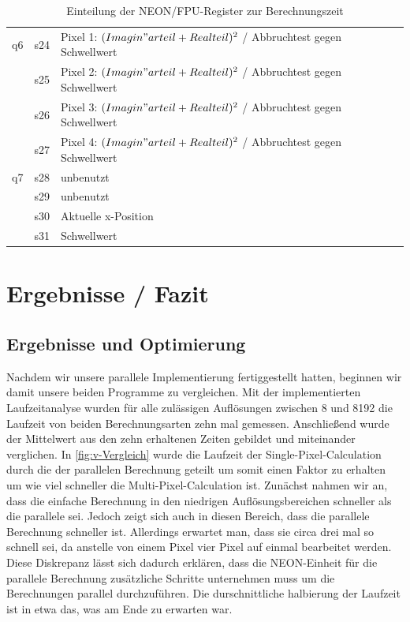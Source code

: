 \documentclass[11pt]{scrartcl}
\begin{document}
\begin{table}[!ht]
\begin{center}
\begin{tabular}{| l | l | l |}
      q6& s24& Pixel 1: $(Imagin"arteil + Realteil)^2$ / Abbruchtest gegen Schwellwert\\ \cline{2-3}
      & s25& Pixel 2: $(Imagin"arteil + Realteil)^2$ / Abbruchtest gegen Schwellwert\\ \cline{2-3}
      & s26& Pixel 3: $(Imagin"arteil + Realteil)^2$ / Abbruchtest gegen Schwellwert\\ \cline{2-3}
      & s27& Pixel 4: $(Imagin"arteil + Realteil)^2$ / Abbruchtest gegen Schwellwert\\ \hline

      q7& s28& unbenutzt\\ \cline{2-3}
      & s29& unbenutzt\\ \cline{2-3}
      & s30& Aktuelle x-Position\\ \cline{2-3}
      & s31& Schwellwert\\ \hline

    \end{tabular}
  \end{center}
  \caption{Einteilung der NEON/FPU-Register zur Berechnungszeit}
  \label{tbl: FPU}
\end{table}


\clearpage
\section{Ergebnisse / Fazit}
\subsection{Ergebnisse und Optimierung}

Nachdem wir unsere parallele Implementierung fertiggestellt hatten, beginnen wir damit unsere beiden Programme zu vergleichen.
Mit der implementierten Laufzeitanalyse wurden für alle zulässigen Auflösungen zwischen 8 und 8192 die Laufzeit von beiden Berechnungsarten zehn mal gemessen.
Anschließend wurde der Mittelwert aus den zehn erhaltenen Zeiten gebildet und miteinander verglichen.
In \autoref{fig:v-Vergleich} wurde die Laufzeit der Single-Pixel-Calculation durch die der parallelen Berechnung geteilt um somit einen Faktor zu erhalten um wie viel schneller die Multi-Pixel-Calculation ist.
Zunächst nahmen wir an, dass die einfache Berechnung in den niedrigen Auflösungsbereichen schneller als die parallele sei. Jedoch zeigt sich auch in diesen Bereich, dass die parallele Berechnung schneller ist.
Allerdings erwartet man, dass sie circa drei mal so schnell sei, da anstelle von einem Pixel vier Pixel auf einmal bearbeitet werden.
Diese Diskrepanz lässt sich dadurch erklären, dass die NEON-Einheit für die parallele Berechnung zusätzliche Schritte unternehmen muss um die Berechnungen parallel durchzuführen.
Die durschnittliche halbierung der Laufzeit ist in etwa das, was am Ende zu erwarten war.
\end{document}
